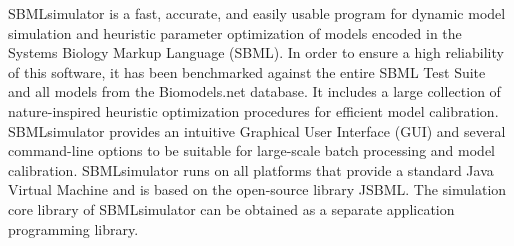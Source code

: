 %
%
SBMLsimulator is a fast, accurate, and easily usable program for dynamic model simulation and heuristic parameter optimization of models encoded in the Systems Biology Markup Language (SBML). In order to ensure a high reliability of this software, it has been benchmarked against the entire SBML Test Suite and all models from the Biomodels.net database. It includes a large collection of nature-inspired heuristic optimization procedures for efficient model calibration. SBMLsimulator provides an intuitive Graphical User Interface (GUI) and several command-line options to be suitable for large-scale batch processing and model calibration. SBMLsimulator runs on all platforms that provide a standard Java Virtual Machine and is based on the open-source library JSBML. The simulation core library of SBMLsimulator can be obtained as a separate application programming library. 
